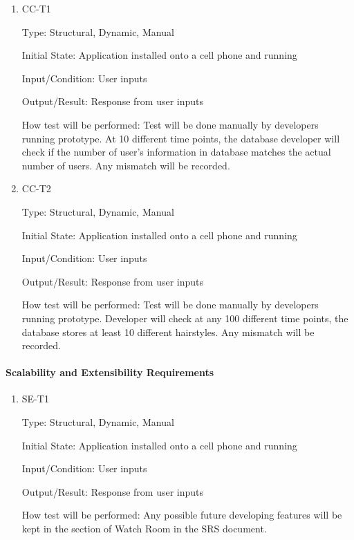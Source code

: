 \documentclass[12pt, titlepage]{article}
\begin{document}
\begin{enumerate}

\item{CC-T1\\}

Type: Structural, Dynamic, Manual
					
Initial State: Application installed onto a cell phone and running
					
Input/Condition: User inputs
					
Output/Result: Response from user inputs
					
How test will be performed: Test will be done manually by developers running prototype. At 10 different time points, the database developer will check if the number of user's information in database matches the actual number of users. Any mismatch will be recorded.
					
\item{CC-T2\\}

Type: Structural, Dynamic, Manual
					
Initial State: Application installed onto a cell phone and running
					
Input/Condition: User inputs
					
Output/Result: Response from user inputs
					
How test will be performed: Test will be done manually by developers running prototype. Developer will check at any 100 different time points, the database stores at least 10 different hairstyles. Any mismatch will be recorded.

\end{enumerate}

\paragraph{Scalability and Extensibility Requirements}

\begin{enumerate}

\item{SE-T1\\}

Type: Structural, Dynamic, Manual
					
Initial State: Application installed onto a cell phone and running
					
Input/Condition: User inputs
					
Output/Result: Response from user inputs
					
How test will be performed: Any possible future developing features will be kept in the section of
Watch Room in the SRS document.

\end{enumerate}
\end{document}
